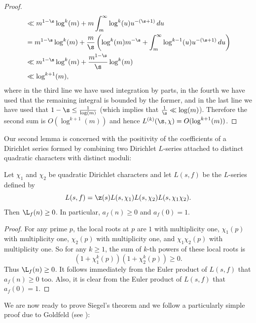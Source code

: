 \begin{proof}
\begin{align*}
        &\ll m^{1-\s}\log^{k}(m)+m\int_{m}^{\infty}\log^{k}(u)u^{-(\s+1)}\,du \\
        &= m^{1-\s}\log^{k}(m)+\frac{m}{\s}\left(\log^{k}(m)m^{-\s}+\int_{m}^{\infty}\log^{k-1}(u)u^{-(\s+1)}\,du\right) \\
        &\ll m^{1-\s}\log^{k}(m)+\frac{m^{1-\s}}{\s}\log^{k}(m) \\
        &\ll \log^{k+1}(m),
      \end{align*}
      where in the third line we have used integration by parts, in the fourth we have used that the remaining integral is bounded by the former, and in the last line we have used that \(1-\s \le \frac{1}{\log(m)}\) (which implies that \(\frac{1}{\s} \ll \log(m)\)). Therefore the second sum is \(O(\log^{k+1}(m))\) and hence \(L^{(k)}(\s,\chi) = O(\log^{k+1}(m))\).
    \end{proof}

    Our second lemma is concerned with the positivity of the coefficients of a Dirichlet series formed by combining two Dirichlet \(L\)-series attached to distinct quadratic characters with distinct moduli:

    \begin{lemma}\label{lem:Siegel_zero_auxiliary_L-function_lemma}
      Let \(\chi_{1}\) and \(\chi_{2}\) be quadratic Dirichlet characters and let \(L(s,f)\) be the \(L\)-series defined by
      \[
        L(s,f) = \z(s)L(s,\chi_{1})L(s,\chi_{2})L(s,\chi_{1}\chi_{2}).
      \]
      Then \(\L_{f}(n) \ge 0\). In particular, \(a_{f}(n) \ge 0\) and \(a_{f}(0) = 1\).
    \end{lemma}
    \begin{proof}
      For any prime \(p\), the local roots at \(p\) are \(1\) with multiplicity one, \(\chi_{1}(p)\) with multiplicity one, \(\chi_{2}(p)\) with multiplicity one, and \(\chi_{1}\chi_{2}(p)\) with multiplicity one. So for any \(k \ge 1\), the sum of \(k\)-th powers of these local roots is
      \[
        (1+\chi_{1}^{k}(p))(1+\chi_{2}^{k}(p)) \ge 0.
      \]
      Thus \(\L_{f}(n) \ge 0\). It follows immediately from the Euler product of \(L(s,f)\) that \(a_{f}(n) \ge 0\) too. Also, it is clear from the Euler product of \(L(s,f)\) that \(a_{f}(0) = 1\).
    \end{proof}

    We are now ready to prove Siegel's theorem and we follow a particularly simple proof due to Goldfeld (see \cite{goldfeld1974simple}):

